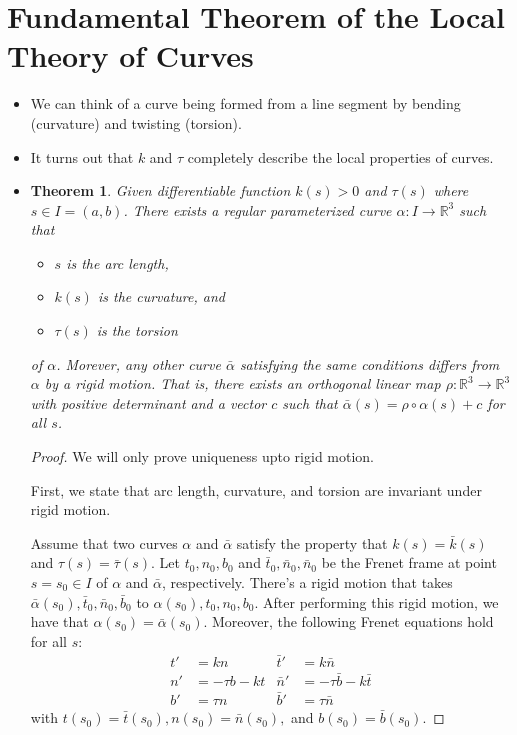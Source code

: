 \documentclass[10pt]{article}
\newtheorem{theorem}[lemma]{Theorem}
\newcommand{\ra}{\rightarrow}
\begin{document}
  \section{Fundamental Theorem of the Local Theory of Curves} %
  \label{sec:fundamental_theorem_of_the_local_theory_of_curves}

  \begin{itemize}
    \item We can think of a curve being formed from a line segment by bending (curvature) and twisting (torsion).

    \item It turns out that $k$ and $\tau$ completely describe the local properties of curves.

    \item \begin{theorem}
      Given differentiable function $k(s) > 0$ and $\tau(s)$ where $s \in I = (a,b)$. There exists a regular parameterized curve $\alpha: I \ra \mathbb{R}^3$ such that
      \begin{itemize}
        \item $s$ is the arc length,
        \item $k(s)$ is the curvature, and 
        \item $\tau(s)$ is the torsion
      \end{itemize}
      of $\alpha$. Morever, any other curve $\bar\alpha$ satisfying the same conditions differs from $\alpha$ by a rigid motion. That is, there exists an orthogonal linear map $\rho : \mathbb{R}^3 \ra \mathbb{R}^3$ with positive determinant and a vector $c$ such that $\bar\alpha(s) = \rho \circ \alpha(s) + c$ for all $s$.
    \end{theorem}

    \begin{proof}
      We will only prove uniqueness upto rigid motion.

      First, we state that arc length, curvature, and torsion are invariant under rigid motion.

      Assume that two curves $\alpha$ and $\bar\alpha$ satisfy the property that $k(s) = \bar k(s)$ and $\tau(s) = \bar\tau(s)$. Let $t_0, n_0, b_0$ and $\bar t_0, \bar n_0, \bar n_0$ be the Frenet frame at point $s = s_0 \in I$ of $\alpha$ and $\bar\alpha$, respectively. There's a rigid motion that takes $\bar \alpha(s_0), \bar t_0, \bar n_0, \bar b_0$ to $\alpha(s_0), t_0, n_0, b_0$. After performing this rigid motion, we have that $\alpha(s_0) = \bar\alpha(s_0)$. Moreover, the following Frenet equations hold for all $s$:
      \begin{align*}
        t' &= k n & \bar t' &= k \bar n\\
        n' &= -\tau b - k t & \bar n' &= -\tau \bar b - k \bar t\\
        b' &= \tau n & \bar b' &= \tau \bar n
      \end{align*}
      with $t(s_0) = \bar t(s_0), n(s_0) = \bar n(s_0),$ and $b(s_0) = \bar b(s_0).$


\end{proof}
\end{itemize}
\end{document}

